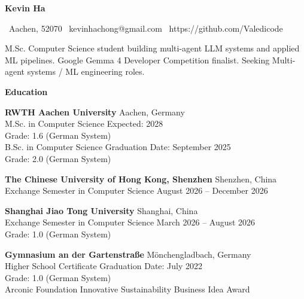\documentclass[10pt]{article}
\begin{document}
\begin{center}
    \textbf{\Large Kevin Ha}\\
    \hrulefill
\end{center}

\begin{center}
\textbullet \ Aachen, 52070 \textbullet \ kevinhachong@gmail.com \textbullet \ https://github.com/Valedicode 
\end{center}

\vspace{1pt}

\begin{center}
M.Sc. Computer Science student building multi-agent LLM systems and applied ML pipelines. Google Gemma 4 Developer Competition finalist. Seeking Multi-agent systems / ML engineering roles.
\end{center}

\vspace{1pt}

\begin{center}
    \textbf{\large Education}
\end{center}

\textbf{RWTH Aachen University} \hfill Aachen, Germany \\
M.Sc. in Computer Science \hfill Expected: 2028 \\
Grade: 1.6 (German System) \\
B.Sc. in Computer Science \hfill Graduation Date: September 2025 \\
Grade: 2.0 (German System)
\vspace{4pt}

\textbf{The Chinese University of Hong Kong, Shenzhen} \hfill Shenzhen, China \\
Exchange Semester in Computer Science \hfill August 2026 – December 2026
\vspace{4pt}

\textbf{Shanghai Jiao Tong University} \hfill Shanghai, China \\
Exchange Semester in Computer Science \hfill March 2026 – August 2026 \\
Grade: 1.0 (German System)
\vspace{4pt}

\textbf{Gymnasium an der Gartenstraße} \hfill Mönchengladbach, Germany \\
Higher School Certificate \hfill Graduation Date: July 2022 \\
Grade: 1.0 (German System) \\
Arconic Foundation Innovative Sustainability Business Idea Award
\end{document}
